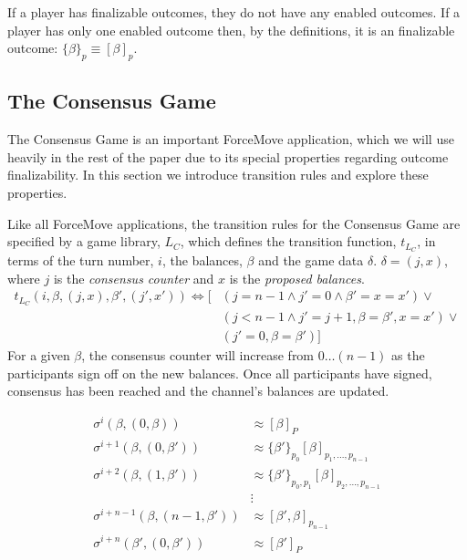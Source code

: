 \documentclass{article}
\theoremstyle{definition}
\newcommand{\enf}[1]{[#1]}
\begin{document}
If a player has finalizable outcomes, they do not have any enabled outcomes.
If a player has only one enabled outcome then, by the definitions, it is an finalizable outcome: $\{\beta \}_p \equiv \enf{\beta}_p$. 


\subsection{The Consensus Game}

The Consensus Game is an important ForceMove application, which we will use heavily in the rest of the paper due to its special properties regarding outcome finalizability. In this section we introduce transition rules and explore these properties.

Like all ForceMove applications, the transition rules for the Consensus Game are specified by a game library, $L_C$, which defines the transition function, $t_{L_C}$, in terms of the turn number, $i$, the balances, $\beta$ and the game data $\delta$. $\delta = (j, x)$, where $j$ is the \textit{consensus counter} and $x$ is the \textit{proposed balances}. 
\begin{align*}
  t_{L_C}(i, \beta, (j, x), \beta', (j', x')) \Leftrightarrow
    [ & (j=n-1 \wedge j'= 0 \wedge \beta' = x = x')  \vee \\
    & (j < n-1 \wedge j' = j+1, \beta = \beta', x = x') \vee \\
    & (j'=0, \beta = \beta') ]
\end{align*}
For a given $\beta$, the consensus counter will increase from $0\dots (n-1)$ as the participants sign off on the new balances. Once all participants have signed, consensus has been reached and the channel's balances are updated.

  \begin{align*}
    \sigma^{i}(\beta, (0, \beta)) & \approx [\beta]_P \\
    \sigma^{i+1}(\beta, (0, \beta')) & \approx \{\beta'\}_{p_0}[\beta]_{p_1, ..., p_{n-1}} \\
    \sigma^{i+2}(\beta, (1, \beta')) & \approx \{\beta'\}_{p_0, p_1}[\beta]_{p_2, ..., p_{n-1}} \\
    &\vdots\\
    \sigma^{i+n-1}(\beta, (n-1, \beta')) & \approx [\beta', \beta]_{p_{n-1}} \\
    \sigma^{i+n}(\beta', (0, \beta')) & \approx [\beta']_{P} \\
  \end{align*}
\end{document}
